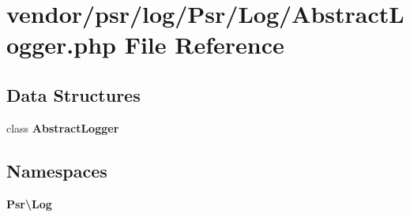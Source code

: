 \section{vendor/psr/log/\+Psr/\+Log/\+Abstract\+Logger.php File Reference}
\label{_abstract_logger_8php}
\subsection*{Data Structures}
\begin{DoxyCompactItemize}
\item 
class {\bf Abstract\+Logger}
\end{DoxyCompactItemize}
\subsection*{Namespaces}
\begin{DoxyCompactItemize}
\item 
 {\bf Psr\textbackslash{}\+Log}
\end{DoxyCompactItemize}
